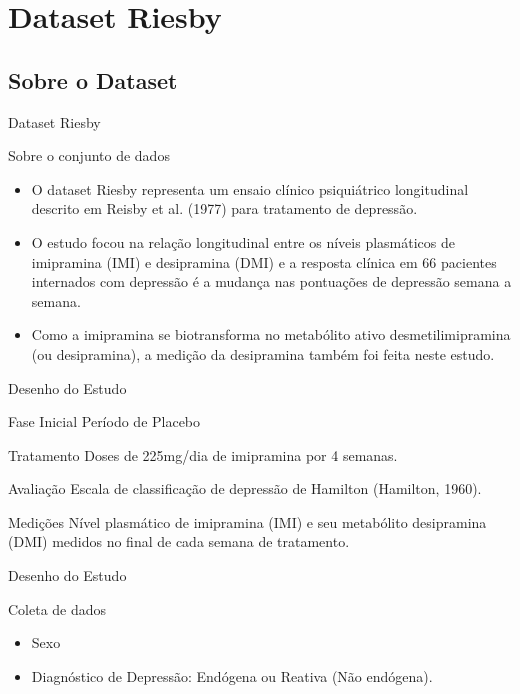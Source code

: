 \section{Dataset Riesby}
\subsection{Sobre o Dataset}
\begin{frame}{Dataset Riesby}
    \begin{block}{Sobre o conjunto de dados}
    	\begin{itemize}
    		\justifying
    		\item O dataset Riesby representa um ensaio clínico psiquiátrico longitudinal descrito em Reisby et al. (1977) para tratamento de depressão.
    		\item O estudo focou na relação longitudinal entre os níveis plasmáticos de imipramina (IMI) e desipramina (DMI) e a resposta clínica em 66 pacientes internados com depressão é a mudança nas pontuações de depressão semana a semana.
    		\item Como a imipramina se biotransforma no metabólito ativo desmetilimipramina (ou desipramina), a medição da desipramina também foi feita neste estudo.
    	\end{itemize}
    \end{block}
\end{frame}

\begin{frame}{Desenho do Estudo}
	\begin{block}{Fase Inicial}
		Período de Placebo 
	\end{block}
	\begin{block}{Tratamento}
		Doses de 225mg/dia de imipramina por 4 semanas.
	\end{block}
	\begin{block}{Avaliação}
		Escala de classificação de depressão de Hamilton (Hamilton, 1960).
	\end{block}
	\begin{block}{Medições}
		Nível plasmático de imipramina (IMI) e seu metabólito desipramina (DMI) medidos no final de cada semana de tratamento.
	\end{block}
\end{frame}

\begin{frame}{Desenho do Estudo}
	\begin{block}{Coleta de dados}
		\begin{itemize}
			\item Sexo
			\item Diagnóstico de Depressão: Endógena ou Reativa (Não endógena).
		\end{itemize}
	\end{block}
\end{frame}

